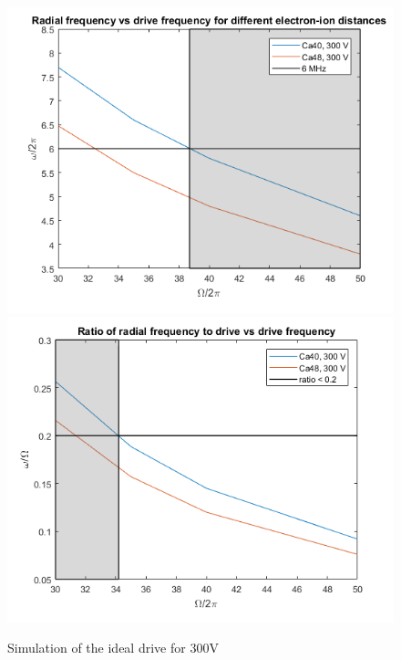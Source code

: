 \begin{figure}[h]
	\centering
	\includegraphics[width=\textwidth]{images/300V_left}
	\includegraphics[width=\textwidth]{images/300V_right}
	\label{fig:ideal_drive_300}
	\caption{Simulation of the ideal drive for 300V}
\end{figure}

